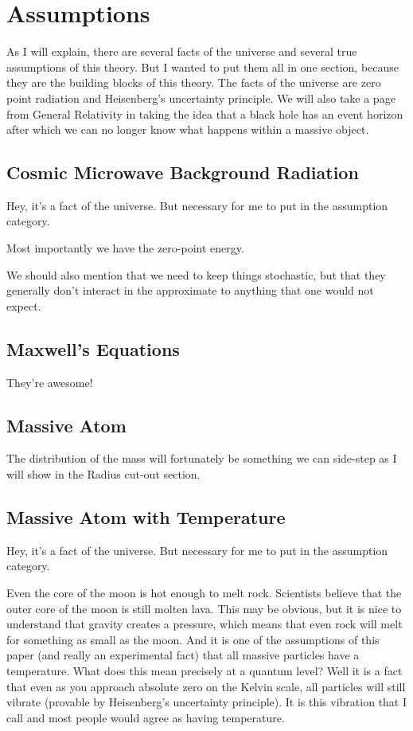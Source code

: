 \documentclass {article}
\begin{document}
\section{Assumptions}
	
	As I will explain, there are several facts of the universe and several true assumptions of this theory. But I wanted to put them all in one section, because they are the building blocks of this theory. The facts of the universe are zero point radiation and Heisenberg’s uncertainty principle. We will also take a page from General Relativity in taking the idea that a black hole has an event horizon after which we can no longer know what happens within a massive object.
	
\subsection{Cosmic Microwave Background Radiation}


Hey, it’s a fact of the universe. But necessary for me to put in the assumption category. 

Most importantly we have the zero-point energy. 

We should also mention that we need to keep things stochastic, but that they generally don’t interact in the approximate to anything that one would not expect.

\subsection{Maxwell’s Equations}

They’re awesome!


\subsection{Massive Atom}

The distribution of the mass will fortunately be something we can side-step as I will show in the Radius cut-out section.

\subsection{Massive Atom with Temperature}

Hey, it’s a fact of the universe. But necessary for me to put in the assumption category. 

Even the core of the moon is hot enough to melt rock. Scientists believe that the outer core of the moon is still molten lava. This may be obvious, but it is nice to understand that gravity creates a pressure, which means that even rock will melt for something as small as the moon. And it is one of the assumptions of this paper (and really an experimental fact) that all massive particles have a temperature. What does this mean precisely at a quantum level? Well it is a fact that even as you approach absolute zero on the Kelvin scale, all particles will still vibrate (provable by Heisenberg’s uncertainty principle). It is this vibration that I call and most people would agree as having temperature.
\end{document}

